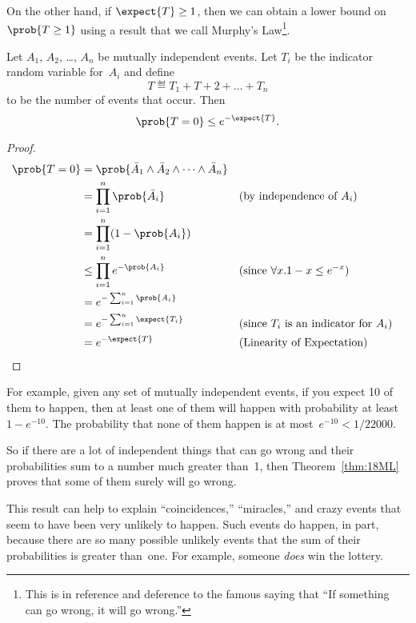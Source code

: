 On the other hand, if $\expect{T} \ge 1$, then we can obtain a lower
bound on~$\prob{T \ge 1}$ using a result that we call Murphy's
Law\footnote{This is in reference and deference to the famous saying
  that ``If something can go wrong, it will go wrong.''}.

\begin{theorem}\label{thm:18ML}
Let $A_1$, $A_2$, \dots, $A_n$ be mutually independent events.  Let
$T_i$ be the indicator random variable for~$A_i$ and define
\begin{equation*}
    T \eqdef T_1 + T+2 + \dots + T_n
\end{equation*}
to be the number of events that occur.  Then
\begin{equation*}
    \prob{T = 0} \le e^{- \expect{T}}.
\end{equation*}
\end{theorem}

\begin{proof}
\begin{align*}
\prob{T = 0}
    &= \prob{ \bar{A}_1 \land \bar{A}_2 \land \dots \land \bar{A}_n } \\
    &= \prod_{i = 1}^n \prob{\bar{A}_i}
        && \text{(by independence of $A_i$)} \\
    &= \prod_{i = 1}^n (1 - \prob{A_i}) \\
    &\le \prod_{i = 1}^n e^{-\prob{A_i}}
        && \text{(since $\forall x. 1 - x \le e^{-x}$)} \\
    &= e^{-\sum_{i = 1}^n \prob{A_i}} \\
    &= e^{-\sum_{i = 1}^n \expect{T_i}} 
        && \text{(since $T_i$ is an indicator for $A_i$)} \\
    &= e^{-\expect{T}}
        && \text{(Linearity of Expectation)}
        & \qedhere
\end{align*}
\end{proof}

For example, given any set of mutually independent events, if you
expect 10 of them to happen, then at least one of them will happen
with probability at least~$1 - e^{-10}$.  The probability that none of
them happen is at most~$e^{-10} < 1/22000$.

So if there are a lot of independent things that can go wrong and their
probabilities sum to a number much greater than~1, then
Theorem~\ref{thm:18ML} proves that some of them surely will go wrong.

This result can help to explain ``coincidences,'' ``miracles,'' and
crazy events that seem to have been very unlikely to happen.  Such
events do happen, in part, because there are so many possible unlikely
events that the sum of their probabilities is greater than~one.  For
example, someone \emph{does} win the lottery.

